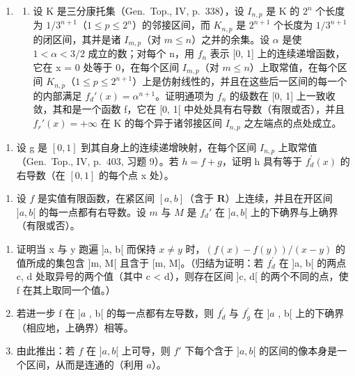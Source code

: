 \begin{enumerate}
\def\labelenumi{\arabic{enumi})}
\setcounter{enumi}{2}
\tightlist
\item
  \begin{enumerate}
  \def\labelenumii{\alph{enumii})}
  \tightlist
  \item
    设 K 是三分康托集（Gen.~Top., IV, p.~338），设 \(I_{n,p}\) 是 K 的 \(2^{n}\) 个长度为 \(1/3^{n+1}\)（\(1 \leqslant p \leqslant 2^{n}\)）的邻接区间，而 \(K_{n,p}\) 是 \(2^{n+1}\) 个长度为 \(1/3^{n+1}\) 的闭区间，其并是诸 \(I_{m,p}\)（对 \(m \leqslant n\)）之并的余集。设 \(\alpha\) 是使 \(1 < \alpha < 3/2\) 成立的数；对每个 n，用 \(f_{n}\) 表示 {[}0, 1{]} 上的连续递增函数，它在 x = 0 处等于 0，在每个区间 \(I_{m,p}\)（对 \(m \leqslant n\)）上取常值，在每个区间 \(K_{n,p}\)（\(1 \leqslant p \leqslant 2^{n+1}\)）上是仿射线性的，并且在这些后一区间的每一个的内部满足 \(f_{d}'(x) = \alpha^{n+1}\)。证明通项为 \(f_{n}\) 的级数在 {[}0, 1{]} 上一致收敛，其和是一个函数 f，它在 {[}0, 1{[} 中处处具有右导数（有限或否），并且 \(f_{r}'(x) = +\infty\) 在 K 的每个异于诸邻接区间 \(I_{n,p}\) 之左端点的点处成立。
  \end{enumerate}
\end{enumerate}

\begin{enumerate}
\def\labelenumi{\alph{enumi})}
\setcounter{enumi}{1}
\tightlist
\item
  设 g 是 \([0, 1]\) 到其自身上的连续递增映射，在每个区间 \(I_{n,p}\) 上取常值（Gen.~Top., IV, p.~403, 习题 9）。若 \(h = f + g\)，证明 h 具有等于 \(f_{d}^{\prime}(x)\) 的右导数（在 \([0, 1]\) 的每个点 x 处）。
\end{enumerate}

\begin{enumerate}
\def\labelenumi{\arabic{enumi})}
\setcounter{enumi}{3}
\tightlist
\item
  设 \(f\) 是实值有限函数，在紧区间 \([a, b]\)（含于 \(\mathbf{R}\)）上连续，并且在开区间 \(]a, b[\) 的每一点都有右导数。设 \(m\) 与 \(M\) 是 \(f_d'\) 在 \(]a, b[\) 上的下确界与上确界（有限或否）。
\end{enumerate}

\begin{enumerate}
\def\labelenumi{\alph{enumi})}
\item
  证明当 x 与 y 跑遍 {]}a, b{[} 而保持 \(x \neq y\) 时，\((f(x) - f(y))/(x - y)\) 的值所成的集包含 {]}m, M{[} 且含于 {[}m, M{]}。（归结为证明：若 \(f_{d}^{\prime}\) 在 {]}a, b{[} 的两点 c, d 处取异号的两个值（其中 c \textless{} d），则存在区间 {]}c, d{[} 的两个不同的点，使 f 在其上取同一个值。）
\item
  若进一步 f 在 \(]a\) , b{[} 的每一点都有左导数，则 \(f_{d}^{\prime}\) 与 \(f_{g}^{\prime}\) 在 \(]a\) , b{[} 上的下确界（相应地，上确界）相等。
\item
  由此推出：若 \(f\) 在 \(]a, b[\) 上可导，则 \(f'\) 下每个含于 \(]a, b[\) 的区间的像本身是一个区间，从而是连通的（利用 \(a\)）。
\end{enumerate}

